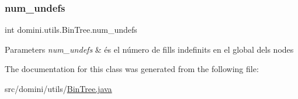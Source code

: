 \subsubsection{\texorpdfstring{num\+\_\+undefs}{num\_undefs}}
{\footnotesize\ttfamily int domini.\+utils.\+Bin\+Tree.\+num\+\_\+undefs\hspace{0.3cm}{\ttfamily [private]}}


\begin{DoxyParams}{Parameters}
{\em num\+\_\+undefs} & és el número de fills indefinits en el global dels nodes \\
\hline
\end{DoxyParams}


The documentation for this class was generated from the following file\+:\begin{DoxyCompactItemize}
\item 
src/domini/utils/\hyperlink{BinTree_8java}{Bin\+Tree.\+java}\end{DoxyCompactItemize}
